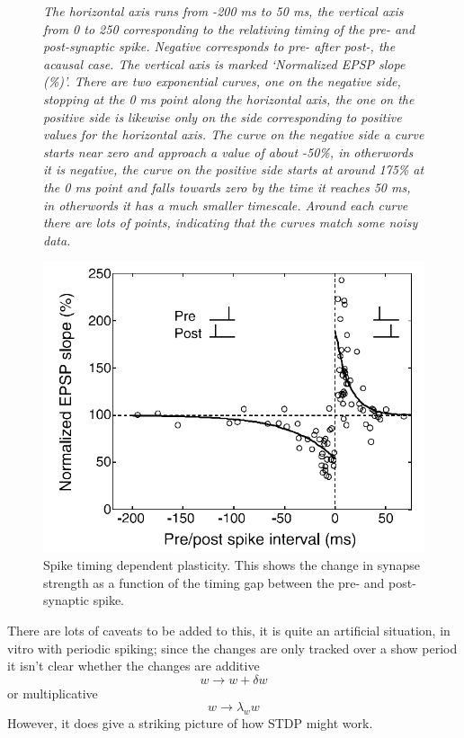\documentclass[12pt]{article}
\begin{document}
\begin{figure}
             {\textsl{The horizontal axis runs from -200 ms to  50 ms, the vertical axis from 0 to 250 corresponding to the relativing timing of the pre- and post-synaptic spike. Negative corresponds to pre- after post-, the acausal case. The vertical axis is marked `Normalized EPSP slope (\%)'. There are two exponential curves, one on the negative side, stopping at the 0 ms point along the horizontal axis, the one on the positive side is likewise only on the side corresponding to positive values for the horizontal axis. The curve on the negative side a curve starts near zero and approach a value of about -50\%, in otherwords it is negative, the curve on the positive side starts at around 175\% at the 0 ms point and falls towards zero by the time it reaches 50 ms, in otherwords it has a much smaller timescale. Around each curve there are lots of points, indicating that the curves match some noisy data. }
             }            
{  \begin{center}
\includegraphics[width=12cm]{DanPoo2004.jpg}
\end{center}}
\caption{Spike timing dependent plasticity. This shows the change in
  synapse strength as a function of the timing gap between the pre-
  and post-synaptic spike. \label{fig:BiPoo}}
\end{figure}

There are lots of caveats to be added to this, it is quite an
artificial situation, in vitro with periodic spiking; since the
changes are only tracked over a show period it isn't clear whether the
changes are additive
\begin{equation}
w\rightarrow w+\delta w
\end{equation}
or multiplicative
\begin{equation}
w\rightarrow \lambda_w w
\end{equation}
However, it does give a striking picture of how STDP might work. 
\end{document}
